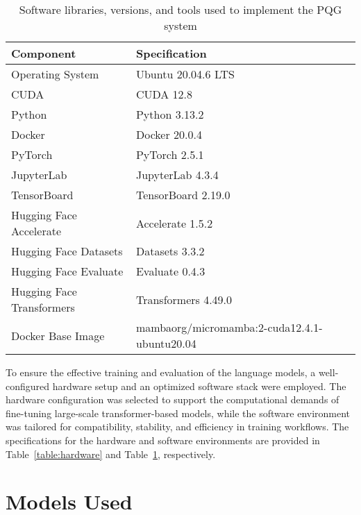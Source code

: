 \begin{table}[t]
  \centering
  \scriptsize
  \renewcommand{\arraystretch}{1.3}
  \begin{tabularx}{0.95\textwidth}{
    >{\raggedright\arraybackslash}p{5cm}
    >{\centering\arraybackslash}X
  }
    \toprule
    \textbf{Component} & \textbf{Specification} \\
    \midrule
    Operating System & Ubuntu 20.04.6 LTS \\
    CUDA & CUDA 12.8 \\
    Python & Python 3.13.2 \\
    Docker & Docker 20.0.4 \\
    PyTorch & PyTorch 2.5.1 \\
    JupyterLab & JupyterLab 4.3.4 \\
    TensorBoard & TensorBoard 2.19.0 \\
    Hugging Face Accelerate & Accelerate 1.5.2 \\
    Hugging Face Datasets & Datasets 3.3.2 \\
    Hugging Face Evaluate & Evaluate 0.4.3 \\
    Hugging Face Transformers & Transformers 4.49.0 \\
    Docker Base Image & mambaorg/micromamba:2-cuda12.4.1-ubuntu20.04 \\
    \bottomrule
  \end{tabularx}
  \caption{Software libraries, versions, and tools used to implement the PQG system}
  \label{table:software}
\end{table}

To ensure the effective training and evaluation of the language models, a well-configured
hardware setup and an optimized software stack were employed. The hardware configuration
was selected to support the computational demands of fine-tuning large-scale
transformer-based models, while the software environment was tailored for compatibility,
stability, and efficiency in training workflows. The specifications for the hardware and
software environments are provided in Table~\ref{table:hardware} and Table~\ref{table:software}, respectively.

\section*{Models Used}

